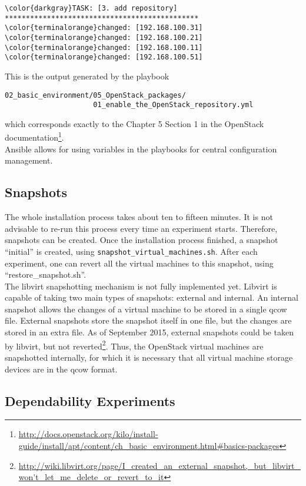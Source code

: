 \begin{appendix}
\begin{Verbatim}[commandchars=\\\{\}]
\color{darkgray}TASK: [3. add repository] **********************************************
\color{terminalorange}changed: [192.168.100.31]
\color{terminalorange}changed: [192.168.100.21]
\color{terminalorange}changed: [192.168.100.11]
\color{terminalorange}changed: [192.168.100.51]
\end{Verbatim}
This is the output generated by the playbook 
\begin{verbatim}
02_basic_environment/05_OpenStack_packages/
                     01_enable_the_OpenStack_repository.yml
\end{verbatim}
which corresponds exactly to the Chapter 5 Section 1 in the OpenStack documentation\footnote{\url{http://docs.openstack.org/kilo/install-guide/install/apt/content/ch_basic_environment.html\#basics-packages}}.\\

Ansible allows for using variables in the playbooks for central configuration management. 

\subsection{Snapshots}
The whole installation process takes about ten to fifteen minutes. It is not advisable to re-run this process every time an experiment starts. Therefore, snapshots can be created. Once the installation process finished, a snapshot ``initial'' is created, using \texttt{snapshot\_virtual\_machines.sh}. After each experiment, one can revert all the virtual machines to this snapshot, using ``restore\_snapshot.sh''.\\

The libvirt snapshotting mechanism is not fully implemented yet. Libvirt is capable of taking two main types of snapshots: external and internal. An internal snapshot allows the changes of a virtual machine to be stored in a single qcow file. External snapshots store the snapshot itself in one file, but the changes are stored in an extra file. As of September 2015, external snapshots could be taken by libvirt, but not reverted\footnote{\url{http://wiki.libvirt.org/page/I_created_an_external_snapshot,_but_libvirt_won't_let_me_delete_or_revert_to_it}}. Thus, the OpenStack virtual machines are snapshotted internally, for which it is necessary that all virtual machine storage devices are in the qcow format.




\subsection{Dependability Experiments}


\end{appendix}
